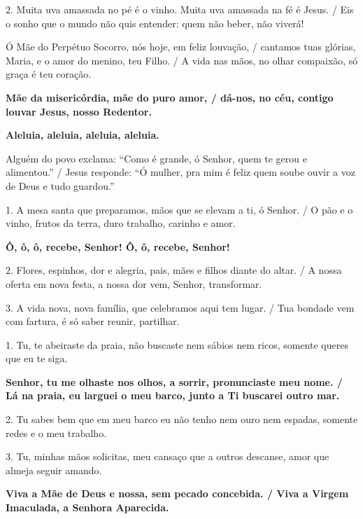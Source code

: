 \documentclass[a5paper,9pt]{extarticle}
\begin{document}
\begin{cantos}
\begin{canto}
2. Muita uva amassada no pé é o vinho. Muita uva amassada na fé é Jesus. / Eis o sonho que o mundo não quis entender: quem não beber, não viverá!
\end{canto}

\begin{canto}
Ó Mãe do Perpétuo Socorro, nós hoje, em feliz louvação, / cantamos tuas glórias, Maria, e o amor do menino, teu Filho. / A vida nas mãos, no olhar compaixão, só graça é teu coração.

\textbf{Mãe da misericórdia, mãe do puro amor, / dá-nos, no céu, contigo louvar Jesus, nosso Redentor.}
\end{canto}

\begin{canto}
\textbf{Aleluia, aleluia, aleluia, aleluia. }

Alguém do povo exclama: ``Como é grande, ó Senhor, quem te gerou e alimentou.'' / Jesus responde: ``Ó mulher, pra mim é feliz quem soube ouvir a voz de Deus e tudo guardou.''
\end{canto}

\begin{canto}
1. A mesa santa que preparamos, mãos que se elevam a ti, ó Senhor. / O pão e o vinho, frutos da terra, duro trabalho, carinho e amor.

\textbf{Ô, ô, ô, recebe, Senhor! Ô, ô, recebe, Senhor!}

2. Flores, espinhos, dor e alegria, pais, mães e filhos diante do altar. / A nossa oferta em nova festa, a nossa dor vem, Senhor, transformar.

3. A vida nova, nova família, que celebramos aqui tem lugar. / Tua bondade vem com fartura, é só saber reunir, partilhar.
\end{canto}

\begin{canto}
1. Tu, te abeiraste da praia, não buscaste nem sábios nem ricos, somente queres que eu te siga.

\textbf{Senhor, tu me olhaste nos olhos, a sorrir, pronunciaste meu nome. / Lá na praia, eu larguei o meu barco, junto a Ti buscarei outro mar.}

2. Tu sabes bem que em meu barco eu não tenho nem ouro nem espadas, somente redes e o meu trabalho.

3. Tu, minhas mãos solicitas, meu cansaço que a outros descanse, amor que almeja seguir amando.
\end{canto}

\begin{canto}
\textbf{Viva a Mãe de Deus e nossa, sem pecado concebida. / Viva a Virgem Imaculada, a Senhora Aparecida.}


\end{canto}
\end{cantos}
\end{document}
